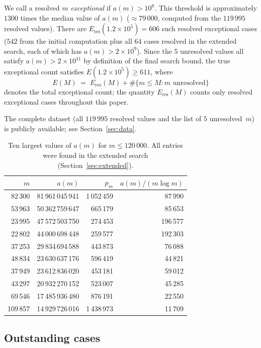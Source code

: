 \documentclass{amsart}
\theoremstyle{definition}
\theoremstyle{remark}
\numberwithin{equation}{section}
\begin{document}
We call a resolved $m$ \emph{exceptional} if $a(m) > 10^8$.
This threshold is approximately $1300$ times the median value of $a(m)$
($\approx 79\,000$, computed from the $119\,995$ resolved values).
There are $E_{\mathrm{res}}(1.2 \times 10^5) = 606$ such resolved exceptional
cases ($542$ from the initial computation plus all $64$ cases resolved
in the extended search, each of which has $a(m) > 2 \times 10^9$).
Since the $5$ unresolved values all satisfy
$a(m) > 2 \times 10^{11}$ by definition of the final search bound,
the true exceptional count satisfies $E(1.2 \times 10^5) \geq 611$, where
\[
E(M) \;=\; E_{\mathrm{res}}(M)
+ \#\bigl\{m \leq M : m \text{ unresolved}\bigr\}
\]
denotes the total exceptional count; the quantity $E_{\mathrm{res}}(M)$
counts only resolved exceptional cases throughout this paper.

The complete dataset (all $119\,995$ resolved values and the list of
$5$ unresolved~$m$) is publicly available; see
Section~\ref{sec:data}.

\begin{table}[ht]
	\centering
	\caption{Ten largest values of $a(m)$ for $m \leq 120\,000$.
		All entries were found in the extended search
		(Section~\ref{sec:extended}).}
	\label{tab:top10}
	\begin{tabular}{rrrr}
		\toprule
		$m$ & $a(m)$ & $p_m$ & $a(m)/(m \log m)$ \\
		\midrule
		82\,300 & 81\,961\,045\,941 & 1\,052\,459 & 87\,990 \\
		53\,963 & 50\,362\,759\,647 &   665\,179 & 85\,653 \\
		23\,995 & 47\,572\,503\,750 &   274\,453 & 196\,577 \\
		22\,802 & 44\,000\,698\,448 &   259\,577 & 192\,303 \\
		37\,253 & 29\,834\,694\,588 &   443\,873 & 76\,088 \\
		48\,834 & 23\,630\,637\,176 &   596\,419 & 44\,821 \\
		37\,949 & 23\,612\,836\,020 &   453\,181 & 59\,012 \\
		43\,297 & 20\,932\,270\,152 &   523\,007 & 45\,285 \\
		69\,546 & 17\,485\,936\,480 &   876\,191 & 22\,550 \\
		109\,857 & 14\,929\,726\,016 & 1\,438\,973 & 11\,709 \\
		\bottomrule
	\end{tabular}
\end{table}

\subsection{Outstanding cases}
\end{document}

